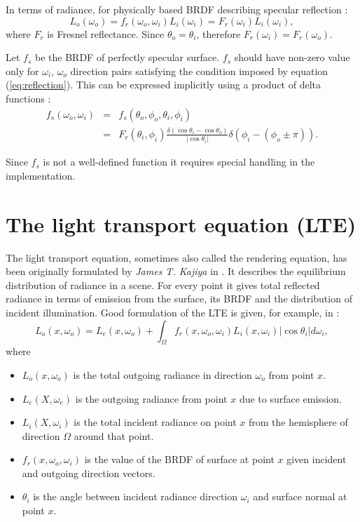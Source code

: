 In terms of radiance, for physically based BRDF describing specular reflection \parencite{phar2010}:
\begin{equation}
  L_{o}(\omega_{o}) = f_{r}(\omega_{o}, \omega_{i}) L_{i}(\omega_{i}) = F_{r}(\omega_{i}) L_{i}(\omega_{i}),
\end{equation}
where $F_{r}$ is Fresnel reflectance. Since $\theta_{o} = \theta_{i}$, therefore $F_{r}(\omega_{i}) = F_{r}(\omega_{o})$.

Let $f_{s}$ be the BRDF of perfectly specular surface. $f_{s}$ should have non-zero value only for $\omega_{i}$, $\omega_{o}$ direction pairs satisfying the condition imposed by equation (\ref{eq:reflection}). This can be expressed implicitly using a product of delta functions \parencite{cohen93}:
\begin{eqnarray}
  f_{s}(\omega_{o}, \omega_{i}) &=& f_{s}(\theta_{o}, \phi_{o}, \theta_{i}, \phi_{i}) \nonumber \\
  &=& F_{r}(\theta_{i}, \phi_{i}) \frac{\delta(\cos\theta_{i} - \cos\theta_{o})}{|\cos\theta_{i}|} \delta(\phi_{i} - (\phi_{o} \pm \pi)).
\end{eqnarray}

Since $f_{s}$ is not a well-defined function it requires special handling in the implementation.

\section{The light transport equation (LTE)}
The light transport equation, sometimes also called the rendering equation, has been originally formulated by \emph{James T. Kajiya} in \cite{kajiya86}. It describes the equilibrium distribution of radiance in a scene. For every point it gives total reflected radiance in terms of emission from the surface, its BRDF and the distribution of incident illumination. Good formulation of the LTE is given, for example, in \cite{phar2010}:
\begin{equation}
  L_{o}(x, \omega_{o}) = L_{e}(x, \omega_{o}) + \int_{\Omega} f_{r}(x, \omega_{o}, \omega_{i}) L_{i}(x, \omega_{i}) |\cos\theta_{i}| d\omega_{i},
\end{equation}
where
\begin{itemize}
\item $L_{o}(x, \omega_{o})$ is the total outgoing radiance in direction $\omega_{o}$ from point $x$.
\item $L_{e}(X, \omega_{e})$ is the outgoing radiance from point $x$ due to surface emission.
\item $L_{i}(X, \omega_{i})$ is the total incident radiance on point $x$ from the hemisphere of direction $\Omega$ around that point.
\item $f_{r}(x, \omega_{o}, \omega_{i})$ is the value of the BRDF of surface at point $x$ given incident and outgoing direction vectors.
\item $\theta_{i}$ is the angle between incident radiance direction $\omega_{i}$ and surface normal at point $x$.
\end{itemize}

